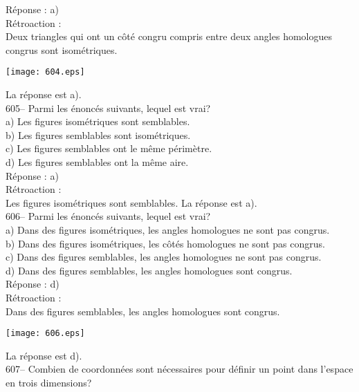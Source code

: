 ﻿\documentclass[letterpaper, 12pt]{article}
\begin{document}
R\'eponse : a) \\

R\'etroaction : \\
Deux triangles qui ont un c\^ot\'e congru compris entre deux angles
homologues congrus sont isom\'etriques.   \begin{center}
    \texttt{[image: 604.eps]}
    \end{center}  La r\'eponse est a).\\

605-- Parmi les \'enonc\'es suivants, lequel est vrai?\\
a) Les figures isom\'etriques sont semblables.\\
b) Les figures semblables sont isom\'etriques.\\
c) Les figures semblables ont le m\^eme p\'erim\`etre.\\
d) Les figures semblables ont la m\^eme aire.\\

R\'eponse : a)\\

R\'etroaction : \\
Les figures isom\'etriques sont semblables.  La r\'eponse est a).\\

606-- Parmi les \'enonc\'es suivants, lequel est vrai?\\
a) Dans des figures isom\'etriques, les angles homologues ne sont pas
congrus.\\
b) Dans des figures isom\'etriques, les c\^ot\'es homologues ne sont pas
congrus.\\
c) Dans des figures semblables, les angles homologues ne sont pas congrus.\\
d) Dans des figures semblables, les angles homologues sont congrus.\\

R\'eponse : d)\\

R\'etroaction : \\
Dans des figures semblables, les angles homologues sont congrus.
\begin{center}
    \texttt{[image: 606.eps]}
    \end{center}  La
r\'eponse est d).\\

607-- Combien de coordonn\'ees sont n\'ecessaires pour d\'efinir un point
dans l'espace en trois dimensions?\\
\end{document}
